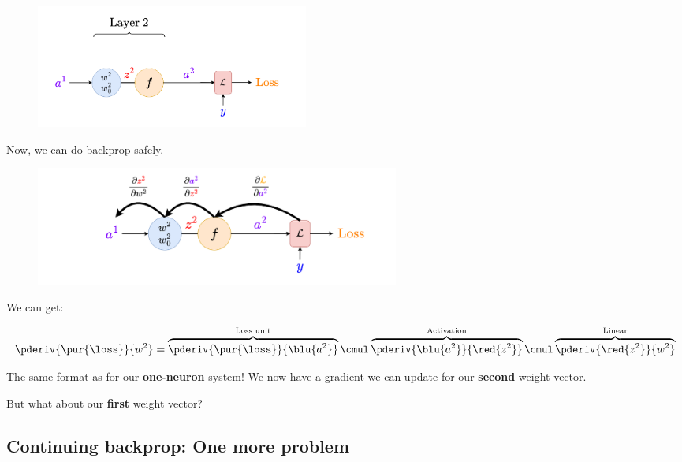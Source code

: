         \begin{figure}[H]
            \centering
            \includegraphics[width=90mm,scale=0.4]{images/nn_1_5_images/layer2_bp.png}
        \end{figure}
        
        Now, we can do backprop safely.
        
        \begin{figure}[H]
            \centering
            \includegraphics[width=120mm,scale=0.4]{images/nn_1_5_images/layer2_bp1.png}
        \end{figure}
        
        We can get:
        
        \begin{equation}
            \pderiv {\pur{\loss}} {w^2} 
            =
            \overbrace{
                \pderiv {\pur{\loss}} {\blu{a^2}} 
            }^{\text{Loss unit}}
            \cmul
            \overbrace{
                \pderiv {\blu{a^2}}     {\red{z^2}}
            }^{\text{Activation}}
                \cmul
            \overbrace{
                \pderiv {\red{z^2}}     {w^2}
            }^{\text{Linear}}
        \end{equation}
        
        The same format as for our \textbf{one-neuron} system! We now have a gradient we can update for our \textbf{second} weight vector.
        
        But what about our \textbf{first} weight vector?
        
    \secdiv
    
    \subsection{Continuing backprop: One more problem}
    
